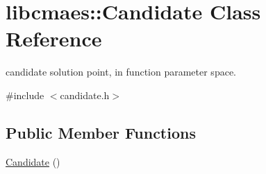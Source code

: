 \hypertarget{classlibcmaes_1_1Candidate}{\section{libcmaes\-:\-:Candidate Class Reference}
\label{classlibcmaes_1_1Candidate}
}


candidate solution point, in function parameter space.  




{\ttfamily \#include $<$candidate.\-h$>$}

\subsection*{Public Member Functions}
\begin{DoxyCompactItemize}
\item 
\hypertarget{classlibcmaes_1_1Candidate_a40fca2abb2e1bcec470a79fa5ae6525f}{\hyperlink{classlibcmaes_1_1Candidate_a40fca2abb2e1bcec470a79fa5ae6525f}{Candidate} ()}\label{classlibcmaes_1_1Candidate_a40fca2abb2e1bcec470a79fa5ae6525f}


\end{DoxyCompactItemize}

